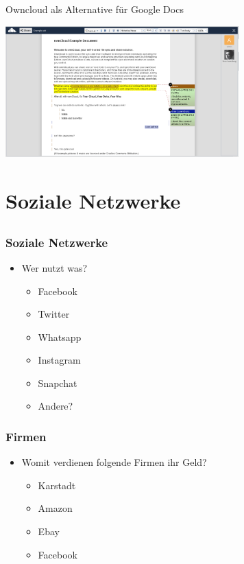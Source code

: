 \documentclass[12pt]{beamer}
\begin{document}
\begin{frame}{Owncloud als Alternative für Google Docs}
  \begin{center}
    \includegraphics[width=9cm]{img/owncloud-documents.png}
  \end{center}
\end{frame}

\section{Soziale Netzwerke}
\subsection{}

\begin{frame}
  \frametitle{Soziale Netzwerke}
  \begin{itemize}
    \item Wer nutzt was?
      \begin{itemize}
        \item<2-> Facebook
        \item<3-> Twitter
        \item<4-> Whatsapp
        \item<5-> Instagram
        \item<6-> Snapchat
        \item<7-> Andere?
      \end{itemize}
  \end{itemize}
\end{frame}

\begin{frame}
  \frametitle{Firmen}
  \begin{itemize}
    \item Womit verdienen folgende Firmen ihr Geld?
      \begin{itemize}
        \item<2-> Karstadt
        \item<3-> Amazon
        \item<4-> Ebay
        \item<5-> Facebook
      \end{itemize}
  \end{itemize}
\end{frame}
\end{document}
